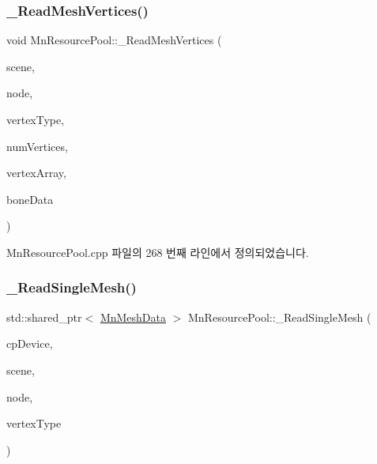 \subsubsection{\texorpdfstring{\+\_\+\+Read\+Mesh\+Vertices()}{\_ReadMeshVertices()}}
{\footnotesize\ttfamily void Mn\+Resource\+Pool\+::\+\_\+\+Read\+Mesh\+Vertices (\begin{DoxyParamCaption}\item[{const ai\+Scene $\ast$}]{scene,  }\item[{const ai\+Node $\ast$}]{node,  }\item[{const std\+::shared\+\_\+ptr$<$ \hyperlink{class_m_n_l_1_1_mn_custom_vertex_type}{Mn\+Custom\+Vertex\+Type} $>$ \&}]{vertex\+Type,  }\item[{U\+I\+NT}]{num\+Vertices,  }\item[{std\+::vector$<$ float $>$ \&}]{vertex\+Array,  }\item[{const std\+::vector$<$ \hyperlink{struct_m_n_l_1_1_mn_resource_pool_1_1___bone_data}{\+\_\+\+Bone\+Data} $>$ \&}]{bone\+Data }\end{DoxyParamCaption})\hspace{0.3cm}{\ttfamily [private]}}



Mn\+Resource\+Pool.\+cpp 파일의 268 번째 라인에서 정의되었습니다.

\mbox{\label{class_m_n_l_1_1_mn_resource_pool_a5e09efdbde37ec94da31e1d5bc1f8c5b}} 
\subsubsection{\texorpdfstring{\+\_\+\+Read\+Single\+Mesh()}{\_ReadSingleMesh()}}
{\footnotesize\ttfamily std\+::shared\+\_\+ptr$<$ \hyperlink{class_m_n_l_1_1_mn_mesh_data}{Mn\+Mesh\+Data} $>$ Mn\+Resource\+Pool\+::\+\_\+\+Read\+Single\+Mesh (\begin{DoxyParamCaption}\item[{const \hyperlink{namespace_m_n_l_a1eec210db8f309a4a9ac0d9658784c31}{C\+P\+D3\+D\+Device} \&}]{cp\+Device,  }\item[{const ai\+Scene $\ast$}]{scene,  }\item[{const ai\+Node $\ast$}]{node,  }\item[{const std\+::shared\+\_\+ptr$<$ \hyperlink{class_m_n_l_1_1_mn_custom_vertex_type}{Mn\+Custom\+Vertex\+Type} $>$ \&}]{vertex\+Type }\end{DoxyParamCaption})\hspace{0.3cm}{\ttfamily [private]}}



